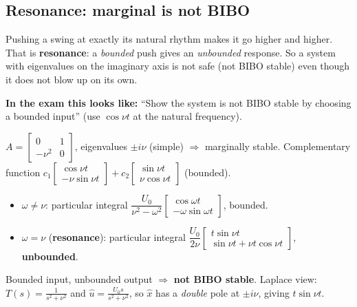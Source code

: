 \subsection{Resonance: marginal is not BIBO \texorpdfstring{}{}}\label{ss:4-5}
\begin{plainbox}
Pushing a swing at exactly its natural rhythm makes it go higher and higher. That is \textbf{resonance}: a \emph{bounded} push gives an
\emph{unbounded} response. So a system with eigenvalues on the imaginary axis is not safe (not BIBO stable) even though it
does not blow up on its own.
\par\smallskip\textbf{In the exam this looks like:} ``Show the system is not BIBO stable by choosing a bounded input'' (use $\cos\nu t$ at the natural frequency).
\end{plainbox}
\begin{workbox}[title={Undamped oscillator $\ddot x+\nu^2x=U_0\cos\omega t$}]
$A=\begin{bmatrix}0&1\\-\nu^2&0\end{bmatrix}$, eigenvalues $\pm i\nu$ (simple) $\Rightarrow$ marginally stable.
Complementary function $c_1\begin{bmatrix}\cos\nu t\\-\nu\sin\nu t\end{bmatrix}+c_2\begin{bmatrix}\sin\nu t\\\nu\cos\nu t\end{bmatrix}$ (bounded).
\begin{itemize}
\item $\omega\neq\nu$: particular integral $\dfrac{U_0}{\nu^2-\omega^2}\begin{bmatrix}\cos\omega t\\-\omega\sin\omega t\end{bmatrix}$, bounded.
\item $\omega=\nu$ (\textbf{resonance}): particular integral $\dfrac{U_0}{2\nu}\begin{bmatrix}t\sin\nu t\\\sin\nu t+\nu t\cos\nu t\end{bmatrix}$, \textbf{unbounded}.
\end{itemize}
Bounded input, unbounded output $\Rightarrow$ \textbf{not BIBO stable}. Laplace view: $T(s)=\frac1{s^2+\nu^2}$ and $\hat u=\frac{U_0s}{s^2+\nu^2}$, so $\hat x$ has a \emph{double} pole at $\pm i\nu$, giving $t\sin\nu t$.
\end{workbox}

